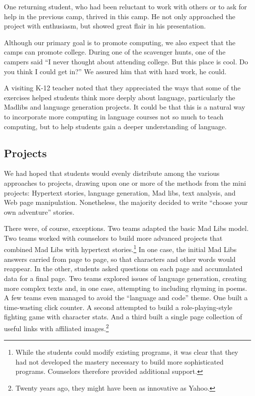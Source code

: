 One returning student, who had been reluctant to work with others
or to ask for help in the previous camp, thrived in this camp.  He not
only approached the project with enthusiasm, but showed great
flair in his presentation.

Although our primary goal is to promote computing, we also expect
that the camps can promote college.  During one of the scavenger
hunts, one of the campers said ``I never thought about attending
college.  But this place is cool.  Do you think I could get in?''
We assured him that with hard work, he could.

A visiting K-12 teacher noted that they appreciated the ways that
some of the exercises helped students think more deeply about
language, particularly the Madlibs and language generation projects.
It could be that this is a natural way to incorporate more computing
in language courses not so much to teach computing, but to help
students gain a deeper understanding of language.

\subsection{Projects}

We had hoped that students would evenly distribute among the various
approaches to projects, drawing upon one or more of the methods
from the mini projects: Hypertext stories, language generation, Mad
libs, text analysis, and Web page manipulation.  Nonetheless, the
majority decided to write ``choose your own adventure'' stories.

There were, of course, exceptions.  Two teams adapted the basic Mad
Libs model.  Two teams worked with counselors to build more advanced
projects that combined Mad Libs with hypertext stories.\footnote{While
the students could modify existing programs, it was clear that they
had not developed the mastery necessary to build more sophisticated
programs.  Counselors therefore provided additional support.}
In one case, the initial Mad Libs answers carried from page to page,
so that characters and other words would reappear.  In the other,
students asked questions on each page and accumulated data for a
final page.  Two teams explored issues of language generation,
creating more complex texts and, in one case, attempting to including
rhyming in poems.  
A few teams even managed to avoid the ``language and code'' theme.
One built a time-wasting click counter.  A second attempted to build
a role-playing-style fighting game with character stats.  And a
third built a single page collection of useful links with affiliated
images.\footnote{Twenty years ago, they might have been as
innovative as Yahoo.}

